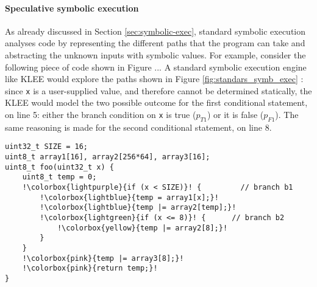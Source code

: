 \documentclass[12pt,a4paper]{book}
\theoremstyle{definition}
\begin{document}
	\paragraph{Speculative symbolic execution} As already discussed in Section \ref{sec:symbolic-exec}, standard symbolic execution analyses code by representing the different paths that the program can take and abstracting the unknown inputs with symbolic values. For example, consider the following piece of code shown in Figure ... A standard symbolic execution engine like KLEE would explore the paths shown in Figure \ref{fig:standars_symb_exec} : since \texttt{x} is a user-supplied value, and therefore cannot be determined statically, the KLEE would model the two possible outcome for the first conditional statement, on line 5: either the branch condition on \texttt{x} is true ($p_{T1}$) or it is false ($p_{F1}$). The same reasoning is made for the second conditional statement, on line 8.
	\begin{lstlisting}[escapechar=!]
uint32_t SIZE = 16; 
uint8_t array1[16], array2[256*64], array3[16];
uint8_t foo(uint32_t x) { 
	uint8_t temp = 0; 
	!\colorbox{lightpurple}{if (x < SIZE)}! {		  // branch b1
		!\colorbox{lightblue}{temp = array1[x];}!
		!\colorbox{lightblue}{temp |= array2[temp];}!
		!\colorbox{lightgreen}{if (x <= 8)}! {		// branch b2
			!\colorbox{yellow}{temp |= array2[8];}!
		}	
	}
	!\colorbox{pink}{temp |= array3[8];}!
	!\colorbox{pink}{return temp;}!
}
	\end{lstlisting}
\end{document}
